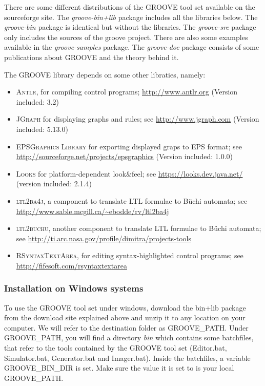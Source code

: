 There are some different distributions of the GROOVE tool set available on the
sourceforge site. The \emph{groove-bin+lib} package includes all the libraries
below. The \emph{groove-bin} package is identical but without the libraries.
The \emph{groove-src} package only includes the sources of the groove project.
There are also some examples available in the \emph{groove-samples} package.
The \emph{groove-doc} package consists of some publications about GROOVE and
the theory behind it.


The GROOVE library depends on some other libraties, namely:

\begin{itemize}\noitemsep
\item \textsc{Antlr}, for compiling control programs;
  \url{http://www.antlr.org} (Version included: 3.2)
\item \textsc{JGraph} for displaying graphs and rules; see
  \url{http://www.jgraph.com} (Version included: 5.13.0)
\item \textsc{EPSGraphics Library} for exporting displayed graps to EPS format;
  see \url{http://sourceforge.net/projects/epsgraphics} (Version included:
  1.0.0)
\item \textsc{Looks} for platform-dependent look\&feel; see
  \url{https://looks.dev.java.net/} (version included: 2.1.4)
\item \textsc{ltl2ba4j}, a component to translate LTL formulae to B\"uchi
  automata; see \url{http://www.sable.mcgill.ca/~ebodde/rv/ltl2ba4j}
\item \textsc{ltl2buchu}, another component to translate LTL formulae to
  B\"uchi automata; see \url{http://ti.arc.nasa.gov/profile/dimitra/projects-tools}
\item \textsc{RSyntaxTextArea}, for editing syntax-highlighted control
  programs; see \url{http://fifesoft.com/rsyntaxtextarea}
\end{itemize}


\subsubsection{Installation on Windows systems}

To use the GROOVE tool set under windows, download the bin+lib package from the
download site explained above and unzip it to any location on your computer. We
will refer to the destination folder as GROOVE\_PATH. Under GROOVE\_PATH, you
will find a directory \emph{bin} which contains some batchfiles, that refer to
the tools contained by the GROOVE tool set (Editor.bat, Simulator.bat,
Generator.bat and Imager.bat). Inside the batchfiles, a variable
GROOVE\_BIN\_DIR is set. Make sure the value it is set to is your local
GROOVE\_PATH.

